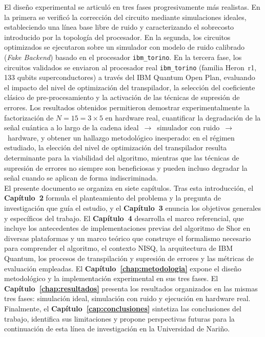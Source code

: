 \documentclass[12pt, spanish]{book}
\begin{document}
El diseño experimental se articuló en tres fases progresivamente más realistas. En la primera se verificó la corrección del circuito mediante simulaciones ideales, estableciendo una línea base libre de ruido y caracterizando el sobrecosto introducido por la topología del procesador. En la segunda, los circuitos optimizados se ejecutaron sobre un simulador con modelo de ruido calibrado (\textit{Fake Backend}) basado en el procesador \texttt{ibm\_torino}. En la tercera fase, los circuitos validados se enviaron al procesador real \texttt{ibm\_torino} (familia Heron~r1, 133 qubits superconductores) a través del IBM Quantum Open Plan, evaluando el impacto del nivel de optimización del transpilador, la selección del coeficiente clásico de pre-procesamiento y la activación de las técnicas de supresión de errores. Los resultados obtenidos permitieron demostrar experimentalmente la factorización de \(N = 15 = 3 \times 5\) en hardware real, cuantificar la degradación de la señal cuántica a lo largo de la cadena ideal~\(\to\)~simulador con ruido~\(\to\)~hardware, y obtener un hallazgo metodológico inesperado: en el régimen estudiado, la elección del nivel de optimización del transpilador resulta determinante para la viabilidad del algoritmo, mientras que las técnicas de supresión de errores no siempre son beneficiosas y pueden incluso degradar la señal cuando se aplican de forma indiscriminada.\\

El presente documento se organiza en siete capítulos. Tras esta introducción, el \textbf{Capítulo~2} formula el planteamiento del problema y la pregunta de investigación que guía el estudio, y el \textbf{Capítulo~3} enuncia los objetivos generales y específicos del trabajo. El \textbf{Capítulo~4} desarrolla el marco referencial, que incluye los antecedentes de implementaciones previas del algoritmo de Shor en diversas plataformas y un marco teórico que construye el formalismo necesario para comprender el algoritmo, el contexto NISQ, la arquitectura de IBM Quantum, los procesos de transpilación y supresión de errores y las métricas de evaluación empleadas. El \textbf{Capítulo~\ref{chap:metodologia}} expone el diseño metodológico y la implementación experimental en sus tres fases. El \textbf{Capítulo~\ref{chap:resultados}} presenta los resultados organizados en las mismas tres fases: simulación ideal, simulación con ruido y ejecución en hardware real. Finalmente, el \textbf{Capítulo~\ref{cap:conclusiones}} sintetiza las conclusiones del trabajo, identifica sus limitaciones y propone perspectivas futuras para la continuación de esta línea de investigación en la Universidad de Nariño.
\end{document}
